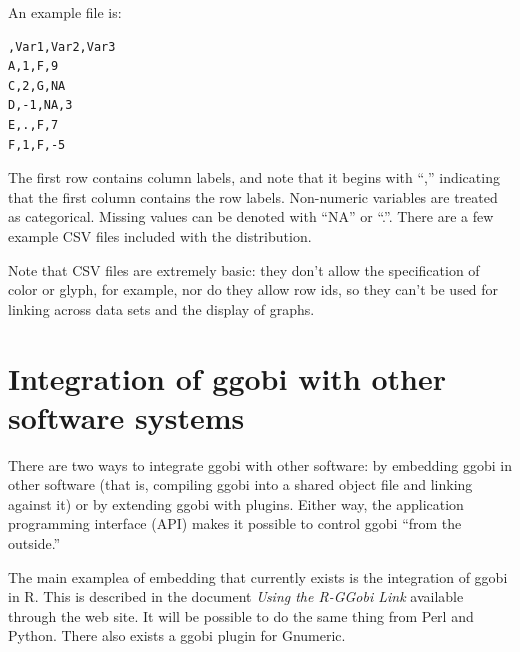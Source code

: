 \documentclass[11pt]{article}
\begin{document}
An example file is:

\begin{verbatim}
,Var1,Var2,Var3
A,1,F,9
C,2,G,NA
D,-1,NA,3
E,.,F,7
F,1,F,-5
\end{verbatim}

The first row contains column labels, and note that it begins with
``,'' indicating that the first column contains the row labels.
Non-numeric variables are treated as categorical.  Missing values can
be denoted with ``NA'' or ``.''. There are a few example CSV
files included with the distribution.

Note that CSV files are extremely basic: they don't allow the
specification of color or glyph, for example, nor do they allow row
ids, so they can't be used for linking across data sets and the
display of graphs.

\section{Integration of ggobi with other software systems}
\label{slbl:Integration}

There are two ways to integrate ggobi with other software: by embedding
ggobi in other software (that is, compiling ggobi into a shared object
file and linking against it) or by extending ggobi with plugins.  Either
way, the application programming interface (API) makes it possible to
control ggobi ``from the outside.''

The main examplea of embedding that currently exists is the integration
of ggobi in R. This is described in the document {\em Using the R-GGobi
Link} available through the web site.   It will be possible to do the
same thing from Perl and Python.  There also exists a ggobi plugin
for Gnumeric.
\end{document}
